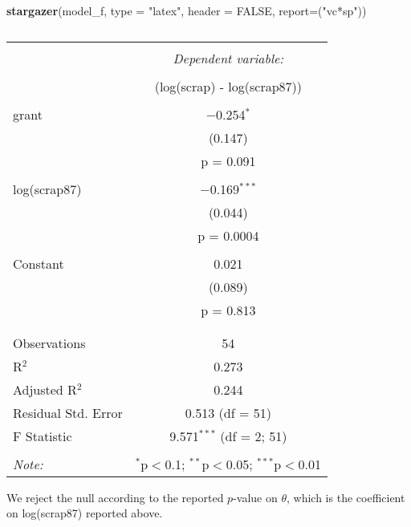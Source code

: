 \documentclass[
]{article}
\newenvironment{Shaded}{\begin{snugshade}}{\end{snugshade}}
\newcommand{\DataTypeTok}[1]{\textcolor[rgb]{0.13,0.29,0.53}{#1}}
\newcommand{\KeywordTok}[1]{\textcolor[rgb]{0.13,0.29,0.53}{\textbf{#1}}}
\newcommand{\NormalTok}[1]{#1}
\newcommand{\OtherTok}[1]{\textcolor[rgb]{0.56,0.35,0.01}{#1}}
\newcommand{\StringTok}[1]{\textcolor[rgb]{0.31,0.60,0.02}{#1}}
\begin{document}
\begin{Shaded}
\begin{Highlighting}[]
\KeywordTok{stargazer}\NormalTok{(model_f, }\DataTypeTok{type =} \StringTok{"latex"}\NormalTok{, }\DataTypeTok{header =} \OtherTok{FALSE}\NormalTok{, }\DataTypeTok{report=}\NormalTok{(}\StringTok{"vc*sp"}\NormalTok{))}
\end{Highlighting}
\end{Shaded}

\begin{table}[!htbp] \centering 
  \caption{} 
  \label{} 
\begin{tabular}{@{\extracolsep{5pt}}lc} 
\\[-1.8ex]\hline 
\hline \\[-1.8ex] 
 & \multicolumn{1}{c}{\textit{Dependent variable:}} \\ 
\cline{2-2} 
\\[-1.8ex] & (log(scrap) - log(scrap87)) \\ 
\hline \\[-1.8ex] 
 grant & $-$0.254$^{*}$ \\ 
  & (0.147) \\ 
  & p = 0.091 \\ 
  & \\ 
 log(scrap87) & $-$0.169$^{***}$ \\ 
  & (0.044) \\ 
  & p = 0.0004 \\ 
  & \\ 
 Constant & 0.021 \\ 
  & (0.089) \\ 
  & p = 0.813 \\ 
  & \\ 
\hline \\[-1.8ex] 
Observations & 54 \\ 
R$^{2}$ & 0.273 \\ 
Adjusted R$^{2}$ & 0.244 \\ 
Residual Std. Error & 0.513 (df = 51) \\ 
F Statistic & 9.571$^{***}$ (df = 2; 51) \\ 
\hline 
\hline \\[-1.8ex] 
\textit{Note:}  & \multicolumn{1}{r}{$^{*}$p$<$0.1; $^{**}$p$<$0.05; $^{***}$p$<$0.01} \\ 
\end{tabular} 
\end{table}

We reject the null according to the reported \(p\)-value on \(\theta\),
which is the coefficient on log(scrap87) reported above.
\end{document}
